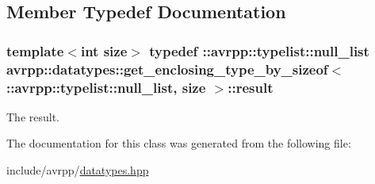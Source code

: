 \subsection{Member Typedef Documentation}
\hypertarget{classavrpp_1_1datatypes_1_1get__enclosing__type__by__sizeof_3_01_1_1avrpp_1_1typelist_1_1null__list_00_01size_01_4_a748a419d43056e002fb2463cddfe54b2}{
\subsubsection[{result}]{\setlength{\rightskip}{0pt plus 5cm}template$<$int size$>$ typedef ::{\bf avrpp::typelist::null\_\-list} avrpp::datatypes::get\_\-enclosing\_\-type\_\-by\_\-sizeof$<$ ::{\bf avrpp::typelist::null\_\-list}, size $>$::{\bf result}}}
\label{classavrpp_1_1datatypes_1_1get__enclosing__type__by__sizeof_3_01_1_1avrpp_1_1typelist_1_1null__list_00_01size_01_4_a748a419d43056e002fb2463cddfe54b2}


The result. 



The documentation for this class was generated from the following file:\begin{DoxyCompactItemize}
\item 
include/avrpp/\hyperlink{datatypes_8hpp}{datatypes.hpp}\end{DoxyCompactItemize}
